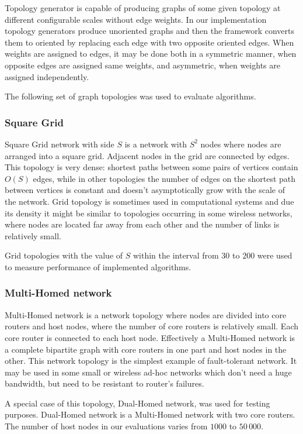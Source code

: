 Topology generator is capable of producing graphs of some given topology at different configurable scales without edge weights. In our implementation topology generators produce unoriented graphs and then the framework converts them to oriented by replacing each edge with two opposite oriented edges. When weights are assigned to edges, it may be done both in a symmetric manner, when opposite edges are assigned same weights, and asymmetric, when weights are assigned independently.

The following set of graph topologies was used to evaluate algorithms.

\subsubsection{Square Grid}

Square Grid network with side $S$ is a network with $S^2$ nodes where nodes are arranged into a square grid. Adjacent nodes in the grid are connected by edges. This topology is very dense: shortest paths between some pairs of vertices contain $O(S)$ edges, while in other topologies the number of edges on the shortest path between vertices is constant and doesn't asymptotically grow with the scale of the network. Grid topology is sometimes used in computational systems and due its density it might be similar to topologies occurring in some wireless networks, where nodes are located far away from each other and the number of links is relatively small.

Grid topologies with the value of $S$ within the interval from $30$ to $200$ were used to measure performance of implemented algorithms.

\subsubsection{Multi-Homed network}

Multi-Homed network is a network topology where nodes are divided into core routers and host nodes, where the number of core routers is relatively small. Each core router is connected to each host node. Effectively a Multi-Homed network is a complete bipartite graph with core routers in one part and host nodes in the other. This network topology is the simplest example of fault-tolerant network. It may be used in some small or wireless ad-hoc networks which don't need a huge bandwidth, but need to be resistant to router's failures.

A special case of this topology, Dual-Homed network, was used for testing purposes. Dual-Homed network is a Multi-Homed network with two core routers. The number of host nodes in our evaluations varies from $1000$ to $50\,000$.

